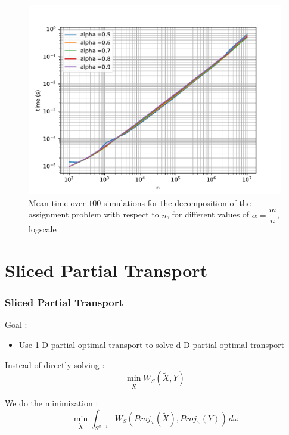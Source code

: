 \documentclass[11pt]{beamer}
\begin{document}
\begin{frame}
\begin{figure}[H]
\includegraphics[scale=0.48]{decomp_time.pdf}
\caption{Mean time over $100$ simulations for the decomposition of the assignment problem with respect to $n$, for different values of $\alpha=\dfrac{m}{n}$, logscale}\label{decomp_time}
\end{figure}
\end{frame}


\section{Sliced Partial Transport}

\begin{frame}

\frametitle{Sliced Partial Transport}

Goal :
\begin{itemize}
\item Use 1-D partial optimal transport to solve d-D partial optimal transport
\end{itemize}


Instead of directly solving :
\begin{equation}
\min_{\tilde{X}} W_S(\tilde{X},Y)
\end{equation}

We do the minimization : 
\begin{equation}
\min_{\tilde{X}} \int_{S^{d-1}} W_S(Proj_\omega(\tilde{X}),Proj_\omega(Y))\,d\omega
\end{equation}
\end{frame}
\end{document}
